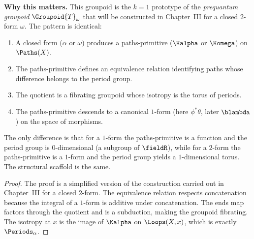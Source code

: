 \begin{article}
  \medskip
  \noindent
  \textbf{Why this matters.}
  This groupoid is the $k=1$ prototype of the \emph{prequantum groupoid}
  $\Groupoid{T}_\omega$ that will be constructed in Chapter~III for a closed $2$-form
  $\omega$.
  The pattern is identical:
  \begin{enumerate}
    \item A closed form ($\alpha$ or $\omega$) produces a paths-primitive
    ($\Kalpha$ or $\Komega$) on $\Paths(X)$.
    \item The paths-primitive defines an equivalence relation identifying
    paths whose difference belongs to the period group.
    \item The quotient is a fibrating groupoid whose isotropy is the
    torus of periods.
    \item The paths-primitive descends to a canonical $1$-form
    (here $\phi^*\theta$, later $\blambda$) on the space of morphisms.
  \end{enumerate}
  The only difference is that for a $1$-form the paths-primitive is a function
  and the period group is $0$-dimensional (a subgroup of $\fieldR$),
  while for a $2$-form the paths-primitive is a $1$-form and the period
  group yields a $1$-dimensional torus.
  The structural scaffold is the same.
\end{article}

\begin{proof}
  The proof is a simplified version of the construction carried out
  in Chapter~III for a closed $2$-form.
  The equivalence relation respects concatenation because
  the integral of a $1$-form is additive under concatenation.
  The ends map factors through the quotient and is a subduction,
  making the groupoid fibrating.
  The isotropy at $x$ is the image of $\Kalpha$ on $\Loops(X,x)$,
  which is exactly $\Periods_\alpha$.
\end{proof}

